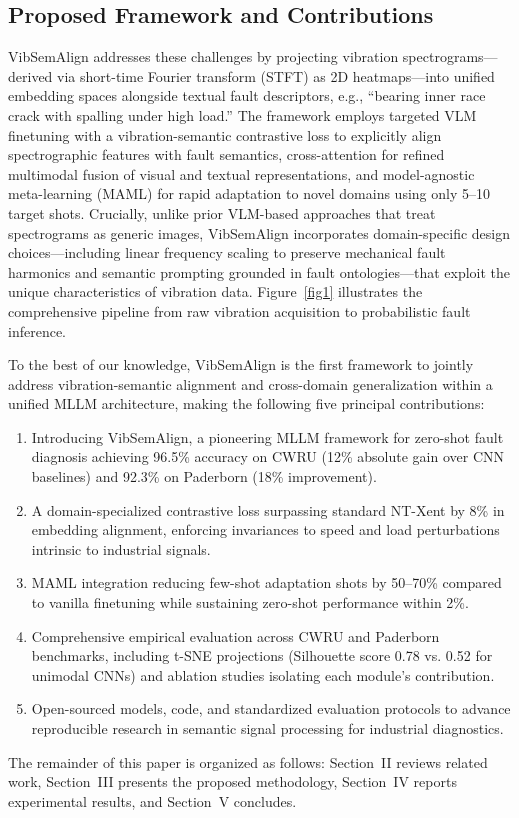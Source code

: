 \subsection{Proposed Framework and Contributions}

VibSemAlign addresses these challenges by projecting vibration spectrograms—derived via short-time Fourier transform (STFT) as 2D heatmaps—into unified embedding spaces alongside textual fault descriptors, e.g., ``bearing inner race crack with spalling under high load.'' The framework employs targeted VLM finetuning with a vibration-semantic contrastive loss to explicitly align spectrographic features with fault semantics, cross-attention for refined multimodal fusion of visual and textual representations, and model-agnostic meta-learning (MAML) for rapid adaptation to novel domains using only 5--10 target shots. Crucially, unlike prior VLM-based approaches that treat spectrograms as generic images, VibSemAlign incorporates domain-specific design choices—including linear frequency scaling to preserve mechanical fault harmonics and semantic prompting grounded in fault ontologies—that exploit the unique characteristics of vibration data. Figure~\ref{fig1} illustrates the comprehensive pipeline from raw vibration acquisition to probabilistic fault inference.

To the best of our knowledge, VibSemAlign is the first framework to jointly address vibration-semantic alignment and cross-domain generalization within a unified MLLM architecture, making the following five principal contributions:
\begin{enumerate}
\item Introducing VibSemAlign, a pioneering MLLM framework for zero-shot fault diagnosis achieving 96.5\% accuracy on CWRU (12\% absolute gain over CNN baselines) and 92.3\% on Paderborn (18\% improvement).
\item A domain-specialized contrastive loss surpassing standard NT-Xent by 8\% in embedding alignment, enforcing invariances to speed and load perturbations intrinsic to industrial signals.
\item MAML integration reducing few-shot adaptation shots by 50--70\% compared to vanilla finetuning while sustaining zero-shot performance within 2\%.
\item Comprehensive empirical evaluation across CWRU and Paderborn benchmarks, including t-SNE projections (Silhouette score 0.78 vs. 0.52 for unimodal CNNs) and ablation studies isolating each module's contribution.
\item Open-sourced models, code, and standardized evaluation protocols to advance reproducible research in semantic signal processing for industrial diagnostics.
\end{enumerate}

The remainder of this paper is organized as follows: Section~II reviews related work, Section~III presents the proposed methodology, Section~IV reports experimental results, and Section~V concludes.
